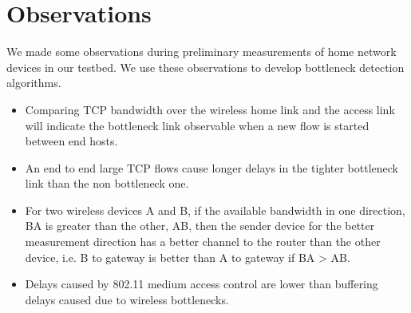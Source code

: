 \section{Observations}

We made some observations during preliminary measurements of home network devices in our testbed. We use these observations to develop bottleneck detection algorithms.
\begin{itemize}
\item Comparing TCP bandwidth over the wireless home link and the access link will indicate the bottleneck link observable when a new flow is started between end hosts.
\item An end to end large TCP flows cause longer delays in the tighter bottleneck link than the non bottleneck one.
\item For two wireless devices A and B, if the available bandwidth in one direction, BA is greater than the other, AB, then the sender device for the better measurement direction has a better channel to the router than the other device, i.e. B to gateway is better than A to gateway if BA > AB.
\item Delays caused by 802.11 medium access control are lower than buffering delays caused due to wireless bottlenecks.
\end{itemize}
